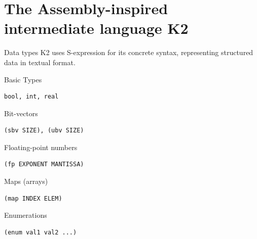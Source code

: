 \documentclass[aspectratio=1610,10.5pt]{beamer} %
\begin{document}
\section{The Assembly-inspired intermediate language K2}

\begin{frame}[fragile]{Data types}
    K2 uses S-expression for its concrete syntax, representing structured data in textual format.
    \begin{block}{Basic Types}
            \begin{verbatim}
bool, int, real
            \end{verbatim}
    \end{block}
    \begin{block}{Bit-vectors}
            \begin{verbatim}
(sbv SIZE), (ubv SIZE)
            \end{verbatim}
    \end{block}
    \begin{block}{Floating-point numbers}
            \begin{verbatim}
(fp EXPONENT MANTISSA)
            \end{verbatim}
    \end{block}
    \begin{block}{Maps (arrays)}
            \begin{verbatim}
(map INDEX ELEM)
            \end{verbatim}
    \end{block}
    \begin{block}{Enumerations}
            \begin{verbatim}
(enum val1 val2 ...)
            \end{verbatim}
    \end{block}
\end{frame}
\end{document}
